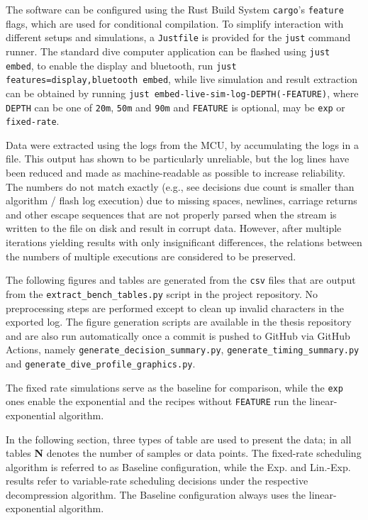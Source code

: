 The software can be configured using the Rust Build System \lstinline{cargo}'s \lstinline{feature} flags, which are used for conditional compilation.
To simplify interaction with different setups and simulations, a \lstinline{Justfile} is provided for the \lstinline{just} command runner. 
The standard dive computer application can be flashed using \lstinline{just embed}, to enable the display and bluetooth, run \lstinline{just features=display,bluetooth embed}, while live simulation and result extraction can be obtained by running \lstinline{just embed-live-sim-log-DEPTH(-FEATURE)}, where \lstinline{DEPTH} can be one of \lstinline{20m}, \lstinline{50m} and \lstinline{90m} and \lstinline{FEATURE} is optional, may be \lstinline{exp} or \lstinline{fixed-rate}.

Data were extracted using the logs from the MCU, by accumulating the logs in a file.
This output has shown to be particularly unreliable, but the log lines have been reduced and made as machine-readable as possible to increase reliability.
The numbers do not match exactly (e.g., see decisions due count is smaller than algorithm / flash log execution) due to missing spaces, newlines, carriage returns and other escape sequences that are not properly parsed when the stream is written to the file on disk and result in corrupt data.
However, after multiple iterations yielding results with only insignificant differences, the relations between the numbers of multiple executions are considered to be preserved.

The following figures and tables are generated from the \texttt{csv} files that are output from the \texttt{extract\_\-bench\_\-tables.py} script in the project repository.
No preprocessing steps are performed except to clean up invalid characters in the exported log.
The figure generation scripts are available in the thesis repository and are also run automatically once a commit is pushed to GitHub via GitHub Actions, namely \texttt{generate\_\-decision\_\-summary.py}, \texttt{generate\_\-timing\_\-summary.py} and \texttt{generate\_\-dive\_\-profile\_\-graphics.py}.

The fixed rate simulations serve as the baseline for comparison, while the \lstinline{exp} ones enable the exponential and the recipes without \lstinline{FEATURE} run the linear-exponential algorithm.

In the following section, three types of table are used to present the data; in all tables \textbf{N} denotes the number of samples or data points.
The fixed-rate scheduling algorithm is referred to as Baseline configuration, while the Exp. and Lin.-Exp. results refer to variable-rate scheduling decisions under the respective decompression algorithm. The Baseline configuration always uses the linear-exponential algorithm.

